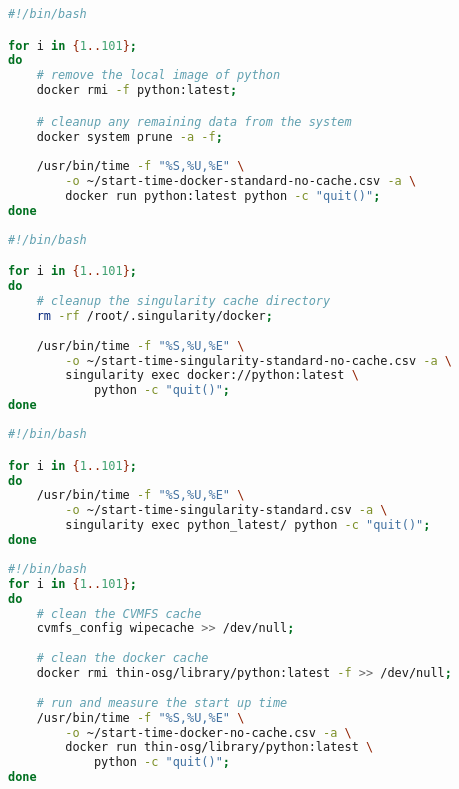 \begin{lstlisting}[language=bash,
caption={Script used to capture the startup time of Docker standard images without Docker cache}]
#!/bin/bash

for i in {1..101}; 
do 
    # remove the local image of python
    docker rmi -f python:latest; 

    # cleanup any remaining data from the system
    docker system prune -a -f; 
    
    /usr/bin/time -f "%S,%U,%E" \
        -o ~/start-time-docker-standard-no-cache.csv -a \
        docker run python:latest python -c "quit()"; 
done
\end{lstlisting}


\begin{lstlisting}[language=bash,
    caption={Script used to capture the startup time of Singularity running Docker standard images without Singularity cache}]
#!/bin/bash

for i in {1..101}; 
do
    # cleanup the singularity cache directory
    rm -rf /root/.singularity/docker; 
    
    /usr/bin/time -f "%S,%U,%E" \
        -o ~/start-time-singularity-standard-no-cache.csv -a \
        singularity exec docker://python:latest \
            python -c "quit()"; 
done
\end{lstlisting}



\begin{lstlisting}[language=bash,
    caption={Script used to capture the startup time of Singularity running images unpacked on the local file-system, hence with cache}]
#!/bin/bash

for i in {1..101}; 
do 
    /usr/bin/time -f "%S,%U,%E" \
        -o ~/start-time-singularity-standard.csv -a \
        singularity exec python_latest/ python -c "quit()"; 
done

\end{lstlisting}

\begin{lstlisting}[language=bash,caption={Script used to capture the startup time of docker thin-images without cache}]
#!/bin/bash
for i in {1..101}; 
do 
    # clean the CVMFS cache
    cvmfs_config wipecache >> /dev/null; 
        
    # clean the docker cache
    docker rmi thin-osg/library/python:latest -f >> /dev/null; 
        
    # run and measure the start up time
    /usr/bin/time -f "%S,%U,%E" \
        -o ~/start-time-docker-no-cache.csv -a \ 
        docker run thin-osg/library/python:latest \
            python -c "quit()"; 
done
\end{lstlisting}
